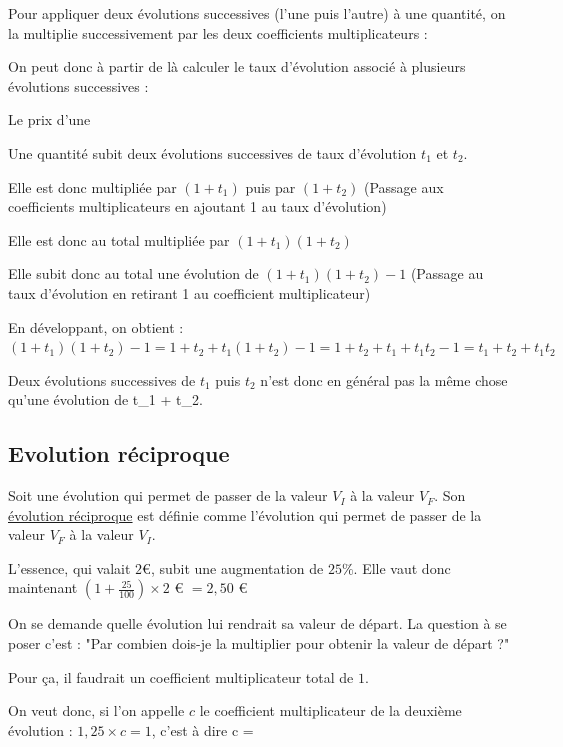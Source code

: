 \documentclass[10pt,a4paper,oneside]{book}
\begin{document}
Pour appliquer deux évolutions successives (l'une puis l'autre) à une quantité, on la multiplie successivement par les deux coefficients multiplicateurs :

On peut donc à partir de là calculer le taux d'évolution associé à plusieurs évolutions successives : 

Le prix d'une 


\begin{prop}
  Une quantité subit  deux évolutions successives de taux d'évolution $t_1$ et $t_2$.

  Elle est donc multipliée par  $(1+t_1)$  puis par $(1+t_2)$  (Passage aux coefficients multiplicateurs en ajoutant 1 au taux d'évolution)
  
  Elle est donc au total multipliée par $(1+t_1)(1+t_2)$ 

  Elle subit donc au total une évolution de $(1+t_1)(1+t_2) -1$  (Passage au taux d'évolution en retirant 1 au coefficient multiplicateur)

\end{prop}


En développant, on obtient : $(1+t_1)(1+t_2) -1 = 1+t_2 + t_1 (1 + t_2) - 1 = 1 + t_2 + t_1 + t_1t_2 -1 = t_1 + t_2 + t_1t_2$

Deux évolutions successives de $t_1$ puis $t_2$ n'est donc en général pas la même chose qu'une évolution de t_1 + t_2.


\subsection{Evolution réciproque}

\begin{de}
  Soit une évolution qui permet de passer de la valeur $V_I$ à la valeur $V_F$. Son \underline{évolution réciproque} est définie comme l'évolution qui permet de passer de la valeur $V_F$ à la valeur $V_I$.
\end{de}


L'essence, qui valait $2$€, subit une augmentation de $25\%$.  
Elle vaut donc  maintenant $(1+\frac{25}{100}) \times 2$ € $= 2{,50}$ €

On se demande quelle évolution lui rendrait sa valeur de départ.  La question à se poser c'est : "Par combien dois-je la multiplier pour obtenir la valeur de départ ?"

Pour ça, il faudrait un coefficient multiplicateur total de $1$. 

On veut donc, si l'on appelle $c$ le coefficient multiplicateur de la deuxième évolution :  $1{,}25 \times c = 1$,  c'est à dire   c = 
\end{document}
